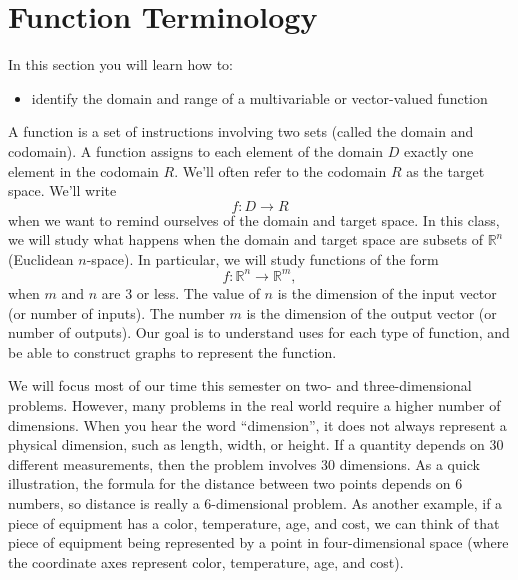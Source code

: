 \documentclass[10pt,]{book}
\theoremstyle{plain}
\theoremstyle{definition}
\theoremstyle{definition}
\theoremstyle{definition}
\theoremstyle{definition}
\theoremstyle{definition}
\numberwithin{equation}{section}
\begin{document}
\section[{Function Terminology}]{Function Terminology}\label{section-15}
In this section you will learn how to: \leavevmode%
\begin{itemize}[label=\textbullet]
\item{}identify the domain and range of a multivariable or vector-valued function%
\end{itemize}
%
\par
A function is a set of instructions involving two sets (called the domain and codomain). A function assigns to each element of the domain \(D\) exactly one element in the codomain \(R\). We'll often refer to the codomain \(R\) as the target space. We'll write%
\begin{equation*}
f\colon D\to R
\end{equation*}
when we want to remind ourselves of the domain and target space. In this class, we will study what happens when the domain and target space are subsets of \({\mathbb{R}}^n\) (Euclidean \(n\)-space). In particular, we will study functions of the form%
\begin{equation*}
f\colon {\mathbb{R}}^n\to {\mathbb{R}}^m,
\end{equation*}
when \(m\) and \(n\) are 3 or less. The value of \(n\) is the dimension of the input vector (or number of inputs). The number \(m\) is the dimension of the output vector (or number of outputs). Our goal is to understand uses for each type of function, and be able to construct graphs to represent the function.%
\par
We will focus most of our time this semester on two- and three-dimensional problems. However, many problems in the real world require a higher number of dimensions. When you hear the word ``dimension'', it does not always represent a physical dimension, such as length, width, or height. If a quantity depends on 30 different measurements, then the problem involves 30 dimensions. As a quick illustration, the formula for the distance between two points depends on 6 numbers, so distance is really a 6-dimensional problem. As another example, if a piece of equipment has a color, temperature, age, and cost, we can think of that piece of equipment being represented by a point in four-dimensional space (where the coordinate axes represent color, temperature, age, and cost).%
\end{document}
